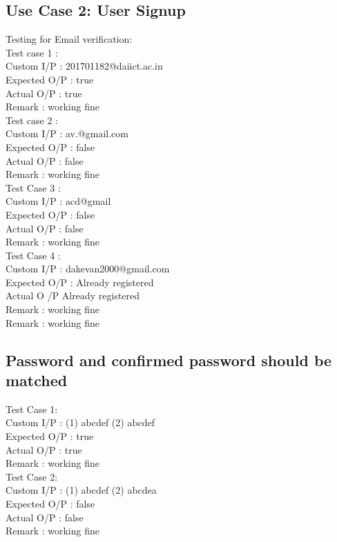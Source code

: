 \documentclass[conference]{IEEEtran}
\begin{document}
\subsection{Use Case 2: User Signup}
Testing for Email verification:\\
Test case 1 :\\
Custom I/P : 201701182@daiict.ac.in\\
Expected O/P : true\\
Actual O/P : true\\
Remark : working fine\\
Test case 2 :\\
Custom I/P : av.@gmail.com\\
Expected O/P : false\\
Actual O/P : false\\
Remark : working fine\\
Test Case 3 :\\
Custom I/P : acd@gmail\\
Expected O/P : false\\
Actual O/P : false\\
Remark : working fine\\
Test Case 4 :\\
Custom I/P : dakevan2000@gmail.com\\
Expected O/P : Already registered\\
Actual O /P Already registered\\
Remark : working fine\\
Remark : working fine\\



\subsection{Password and confirmed password should be matched}
Test Case 1:\\
Custom I/P : (1) abcdef (2) abcdef\\
Expected O/P : true\\
Actual O/P : true\\
Remark : working fine\\
Test Case 2:\\
Custom I/P : (1) abcdef (2) abcdea\\
Expected O/P : false\\
Actual O/P : false\\
Remark : working fine\\
\end{document}
